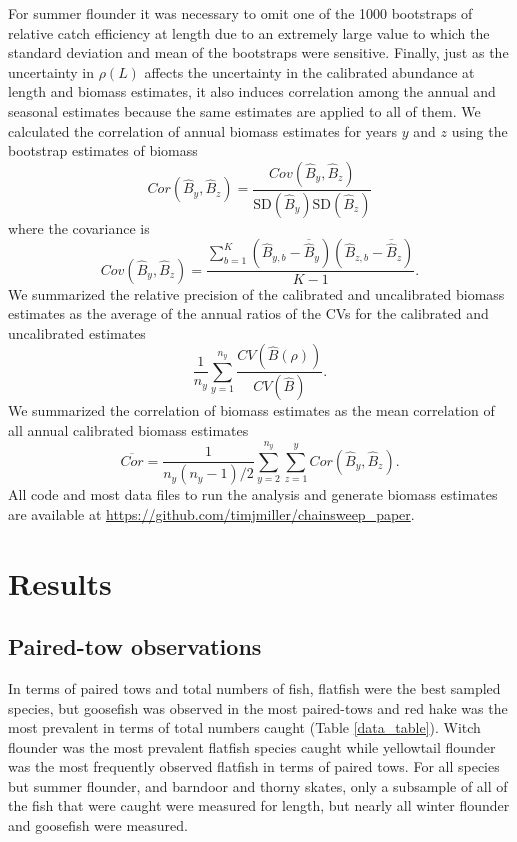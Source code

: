 \documentclass[
  12pt,
]{article}
\begin{document}
For summer flounder it was necessary to omit one of the 1000 bootstraps
of relative catch efficiency at length due to an extremely large value
to which the standard deviation and mean of the bootstraps were
sensitive. Finally, just as the uncertainty in \(\rho\left(L\right)\)
affects the uncertainty in the calibrated abundance at length and
biomass estimates, it also induces correlation among the annual and
seasonal estimates because the same estimates are applied to all of
them. We calculated the correlation of annual biomass estimates for
years \(y\) and \(z\) using the bootstrap estimates of biomass \[
Cor\left(\widehat B_y, \widehat B_z\right) = \frac{Cov\left(\widehat B_y, \widehat B_z\right)}{\text{SD}\left(\widehat B_y\right)\text{SD}\left(\widehat B_z\right)}
\] where the covariance is \[
Cov\left(\widehat B_y, \widehat B_z\right) = \frac{\sum_{b=1}^K \left(\widehat B_{y,b} - \overline{\widehat B}_y\right)\left(\widehat B_{z,b} - \overline{\widehat B}_z\right)}{K-1}.
\] We summarized the relative precision of the calibrated and
uncalibrated biomass estimates as the average of the annual ratios of
the CVs for the calibrated and uncalibrated estimates \[
\frac{1}{n_y} \sum^{n_y}_{y = 1}\frac{CV\left(\widehat B\left(\rho\right)\right)}{CV\left(\widehat B\right)}.
\] We summarized the correlation of biomass estimates as the mean
correlation of all annual calibrated biomass estimates \[
\overline {Cor} = \frac{1}{n_y(n_y-1)/2} \sum_{y=2}^{n_y} \sum_{z=1}^{y} Cor\left(\widehat B_y, \widehat B_z\right).
\] All code and most data files to run the analysis and generate biomass
estimates are available at
\url{https://github.com/timjmiller/chainsweep_paper}.

\hypertarget{results}{%
\section{Results}\label{results}}

\hypertarget{paired-tow-observations}{%
\subsection{Paired-tow observations}\label{paired-tow-observations}}

In terms of paired tows and total numbers of fish, flatfish were the
best sampled species, but goosefish was observed in the most paired-tows
and red hake was the most prevalent in terms of total numbers caught
(Table \ref{data_table}). Witch flounder was the most prevalent flatfish
species caught while yellowtail flounder was the most frequently
observed flatfish in terms of paired tows. For all species but summer
flounder, and barndoor and thorny skates, only a subsample of all of the
fish that were caught were measured for length, but nearly all winter
flounder and goosefish were measured.
\end{document}
